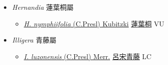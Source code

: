 
  \begin{itemize}
 \item[] \textit{Hernandia} 蓮葉桐屬
                    
  \begin{itemize}
        \item[] \href{http://www.theplantlist.org/tpl1.1/search?q=Hernandia+nymphiifolia}{\textit{H. nymphiifolia} (C.Presl) Kubitzki}   \href{\detokenize{http://taibnet.sinica.edu.tw/chi/taibnet_species_list.php?T2=蓮葉桐&T2_new_value=true&fr=y}}{蓮葉桐} VU
  \end{itemize}
 \item[] \textit{Illigera} 青藤屬
                    
  \begin{itemize}
        \item[] \href{http://www.theplantlist.org/tpl1.1/search?q=Illigera+luzonensis}{\textit{I. luzonensis} (C.Presl) Merr.}   \href{\detokenize{http://taibnet.sinica.edu.tw/chi/taibnet_species_list.php?T2=呂宋青藤&T2_new_value=true&fr=y}}{呂宋青藤} LC
  \end{itemize}
  \end{itemize}
